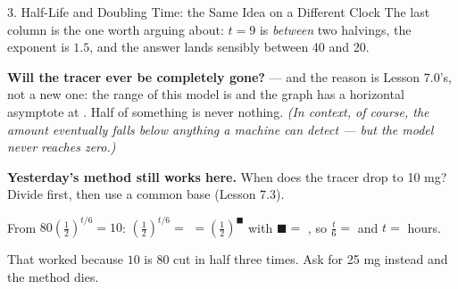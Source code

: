 \documentclass[10pt]{article}
\begin{document}
\begin{notesbox}{3. Half-Life and Doubling Time: the Same Idea on a Different Clock}
\vspace{2pt}
The last column is the one worth arguing about: $t=9$ is \emph{between} two halvings, the exponent is
$1.5$, and the answer lands sensibly between 40 and 20.

\vspace{3pt}
\textbf{Will the tracer ever be completely gone?}  --- and the reason is Lesson 7.0's, not
a new one: the range of this model is \ans{$(0,80]$} and the graph has a horizontal asymptote at
. Half of something is never nothing. \emph{(In context, of course, the amount eventually
falls below anything a machine can detect --- but the model never reaches zero.)}

\vspace{4pt}
\begin{tcolorbox}[colback=greenbg, colframe=greenacc, boxrule=0.8pt, arc=1.5mm,
    left=2.5mm, right=2.5mm, top=1.5mm, bottom=1.5mm]
\textbf{Yesterday's method still works here.} When does the tracer drop to 10 mg? Divide first, then
use a common base (Lesson 7.3).

\vspace{3pt}
\hspace*{1.0em} From $80\left(\frac12\right)^{t/6}=10$: \quad
$\left(\frac12\right)^{t/6}=$  $=\left(\frac12\right)^{\blacksquare}$ with
$\blacksquare=$ , \quad so $\frac{t}{6}=$  \; and \; $t=$  hours.

\vspace{3pt}
That worked because $10$ is $80$ cut in half three times. Ask for 25 mg instead and the method dies.
\end{tcolorbox}
\end{notesbox}
\end{document}
